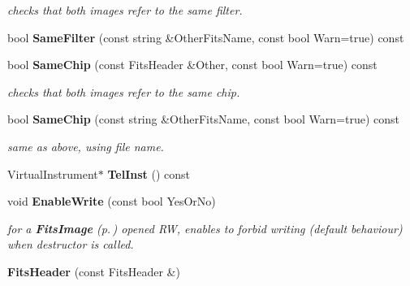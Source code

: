 \begin{CompactItemize}
\begin{CompactList}\small\item\em checks that both images refer to the same filter.\item\end{CompactList}\item 
{}
bool {\bf Same\-Filter} (const string \&Other\-Fits\-Name, const bool Warn=true) const\label{class_fitsheader_a41}

\item 
{}
bool {\bf Same\-Chip} (const Fits\-Header \&Other, const bool Warn=true) const\label{class_fitsheader_a42}

\begin{CompactList}\small\item\em checks that both images refer to the same chip.\item\end{CompactList}\item 
{}
bool {\bf Same\-Chip} (const string \&Other\-Fits\-Name, const bool Warn=true) const\label{class_fitsheader_a43}

\begin{CompactList}\small\item\em same as above, using file name.\item\end{CompactList}\item 
{}
Virtual\-Instrument$\ast$ {\bf Tel\-Inst} () const\label{class_fitsheader_a44}

\item 
void {\bf Enable\-Write} (const bool Yes\-Or\-No)
\begin{CompactList}\small\item\em for a {\bf Fits\-Image} {\rm (p.\,\pageref{class_fitsimage})} opened RW, enables to forbid writing (default behaviour) when destructor is called.\item\end{CompactList}\item 
{}
{\bf Fits\-Header} (const Fits\-Header \&)\label{class_fitsheader_a46}


\end{CompactItemize}
